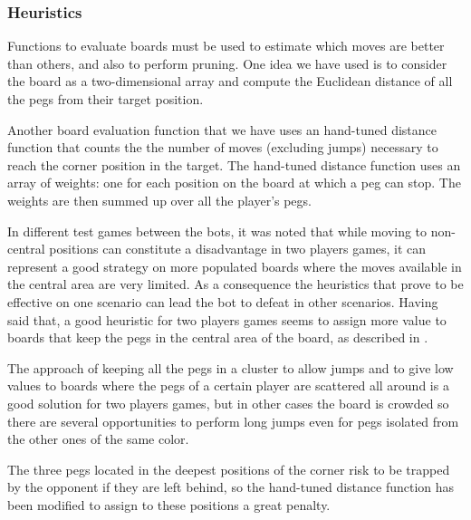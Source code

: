 \documentclass[a4paper,11pt]{article}
\begin{document}
\subsubsection{Heuristics}
Functions to evaluate boards must be used to estimate which moves are
better than others, and also to perform pruning. One idea we have used
is to consider the board as a two-dimensional array and compute the
Euclidean distance of all the pegs from their target position.


Another board evaluation function that we have uses an hand-tuned
distance function that counts the the number of moves (excluding
jumps) necessary to reach the corner position in the target. The
hand-tuned distance function uses an array of weights: one for each
position on the board at which a peg can stop. The weights are then
summed up over all the player's pegs.

In different test games between the bots, it was noted that while moving to
non-central positions can constitute a disadvantage in two players games, it can
represent a good strategy on more populated boards where the moves available in
the central area are very limited. As a consequence the heuristics that prove to
be effective on one scenario can lead the bot to defeat in other scenarios.
Having said that, a good heuristic for two players games seems to assign more
value to boards that keep the pegs in the central area of the board, as
described in \cite{ulfhake}.

The approach of keeping all the pegs in a cluster to allow jumps and to give low
values to boards where the pegs of a certain player are scattered all around is
a good solution for two players games, but in other cases the board is crowded
so there are several opportunities to perform long jumps even for pegs isolated
from the other ones of the same color.

The three pegs located in the deepest positions of the corner risk to be trapped
by the opponent if they are left behind, so the hand-tuned distance function has
been modified to assign to these positions a great penalty.
\end{document}
